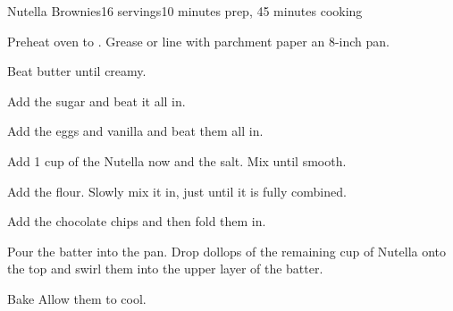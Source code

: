 \documentclass[../Cookbook.tex]{subfiles}
\begin{document}
\begin{recipe}{Nutella Brownies}{16 servings}{10 minutes prep, 45 minutes cooking}

	Preheat oven to . Grease or line with parchment paper an 8-inch pan.

	Beat butter until creamy.

	Add the sugar and beat it all in.

	Add the eggs and vanilla and beat them all in.

	Add 1 cup of the Nutella now and the salt. Mix until smooth.

	Add the flour. Slowly mix it in, just until it is fully combined.

	Add the chocolate chips and then fold them in.

	Pour the batter into the pan. Drop dollops of the remaining  cup of Nutella onto the top and swirl them into the upper layer of the batter.

	\newstep
	Bake  Allow them to cool.

\end{recipe}
\end{document}
